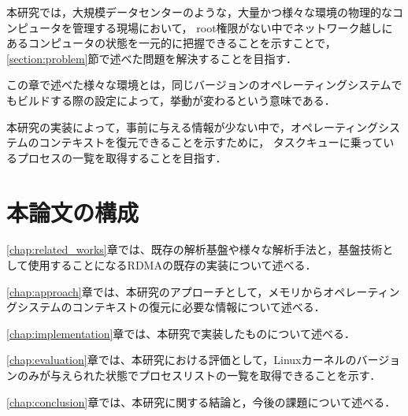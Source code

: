 本研究では，大規模データセンターのような，大量かつ様々な環境の物理的なコンピュータを管理する現場において，
root権限がない中でネットワーク越しにあるコンピュータの状態を一元的に把握できることを示すことで，\ref{section:problem}節で述べた問題を解決することを目指す．

この章で述べた様々な環境とは，同じバージョンのオペレーティングシステムでもビルドする際の設定によって，挙動が変わるという意味である．

本研究の実装によって，事前に与える情報が少ない中で，オペレーティングシステムのコンテキストを復元できることを示すために，
タスクキューに乗っているプロセスの一覧を取得することを目指す．





\section{本論文の構成}

\ref{chap:related_works}章では、既存の解析基盤や様々な解析手法と，基盤技術として使用することになるRDMAの既存の実装について述べる．

\ref{chap:approach}章では、本研究のアプローチとして，メモリからオペレーティングシステムのコンテキストの復元に必要な情報について述べる．

\ref{chap:implementation}章では、本研究で実装したものについて述べる．

\ref{chap:evaluation}章では、本研究における評価として，Linuxカーネルのバージョンのみが与えられた状態でプロセスリストの一覧を取得できることを示す．

\ref{chap:conclusion}章では、本研究に関する結論と，今後の課題について述べる．
